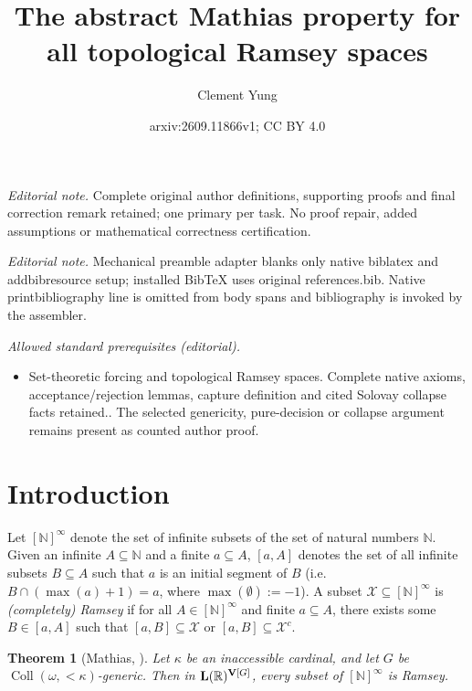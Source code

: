 \documentclass[10pt,a4paper]{amsart}
\title{The abstract Mathias property for all topological Ramsey spaces}
\author{Clement Yung}
\date{arxiv:2609.11866v1; CC BY 4.0}
\theoremstyle{plain}
\numberwithin{equation}{section}
\newtheorem{theorem}{Theorem}[section]
\theoremstyle{definition}
\newcommand{\func}{\operatorname}
\newcommand{\R}{\mathbb{R}}
\newcommand{\N}{\mathbb{N}}
\newcommand{\cal}{\mathcal}
\renewcommand{\bf}{\mathbf}
\newcommand{\Coll}{\func{Coll}}
\newcommand{\V}{\bf{V}}
\newcommand{\X}{\cal{X}}
\DeclareRobustCommand{\L}{\ifmmode\mathbf{L}\else\strokeL\fi}
\begin{document}
\maketitle
\noindent\textit{Editorial note.} Complete original author definitions, supporting proofs and final correction remark retained; one primary per task. No proof repair, added assumptions or mathematical correctness certification.\par\medskip
\noindent\textit{Editorial note.} Mechanical preamble adapter blanks only native biblatex and addbibresource setup; installed BibTeX uses original references.bib. Native printbibliography line is omitted from body spans and bibliography is invoked by the assembler.\par\medskip
\noindent\textit{Allowed standard prerequisites (editorial).}\begin{itemize}
\item Set-theoretic forcing and topological Ramsey spaces. Complete native axioms, acceptance/rejection lemmas, capture definition and cited Solovay collapse facts retained.. The selected genericity, pure-decision or collapse argument remains present as counted author proof.
\end{itemize}\medskip
\section{Introduction}
\label{sec:intro}
Let $[\N]^\infty$ denote the set of infinite subsets of the set of natural numbers $\N$. Given an infinite $A \subseteq \N$ and a finite $a \subseteq A$, $[a,A]$ denotes the set of all infinite subsets $B \subseteq A$ such that $a$ is an initial segment of $B$ (i.e. $B \cap (\max(a) + 1) = a$, where $\max(\emptyset) := -1$). A subset $\X \subseteq [\N]^\infty$ is \emph{(completely) Ramsey} if for all $A \in [\N]^\infty$ and finite $a \subseteq A$, there exists some $B \in [a,A]$ such that $[a,B] \subseteq \X$ or $[a,B] \subseteq \X^c$. 

\begin{theorem}[Mathias, \cite{M77}]
\label{thm:Mathias}
    Let $\kappa$ be an inaccessible cardinal, and let $G$ be $\Coll(\omega,{<}\kappa)$-generic. Then in $\L(\R)^{\V[G]}$, every subset of $[\N]^\infty$ is Ramsey.
\end{theorem}
\end{document}
